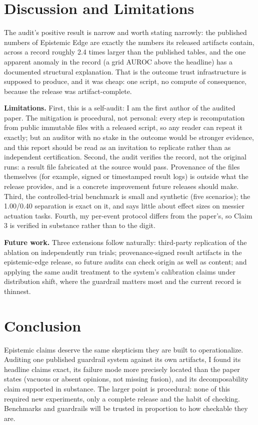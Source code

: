\documentclass[11pt]{article}
\begin{document}
\section{Discussion and Limitations}

The audit's positive result is narrow and worth stating narrowly: the published numbers of Epistemic Edge are exactly the numbers its released artifacts contain, across a record roughly 2.4 times larger than the published tables, and the one apparent anomaly in the record (a grid AUROC above the headline) has a documented structural explanation. That is the outcome trust infrastructure is supposed to produce, and it was cheap: one script, no compute of consequence, because the release was artifact-complete.

\textbf{Limitations.} First, this is a self-audit: I am the first author of the audited paper. The mitigation is procedural, not personal: every step is recomputation from public immutable files with a released script, so any reader can repeat it exactly; but an auditor with no stake in the outcome would be stronger evidence, and this report should be read as an invitation to replicate rather than as independent certification. Second, the audit verifies the record, not the original runs: a result file fabricated at the source would pass. Provenance of the files themselves (for example, signed or timestamped result logs) is outside what the release provides, and is a concrete improvement future releases should make. Third, the controlled-trial benchmark is small and synthetic (five scenarios); the 1.00/0.40 separation is exact on it, and says little about effect sizes on messier actuation tasks. Fourth, my per-event protocol differs from the paper's, so Claim 3 is verified in substance rather than to the digit.

\textbf{Future work.} Three extensions follow naturally: third-party replication of the ablation on independently run trials; provenance-signed result artifacts in the epistemic-edge release, so future audits can check origin as well as content; and applying the same audit treatment to the system's calibration claims under distribution shift, where the guardrail matters most and the current record is thinnest.

\section{Conclusion}

Epistemic claims deserve the same skepticism they are built to operationalize. Auditing one published guardrail system against its own artifacts, I found its headline claims exact, its failure mode more precisely located than the paper states (vacuous or absent opinions, not missing fusion), and its decomposability claim supported in substance. The larger point is procedural: none of this required new experiments, only a complete release and the habit of checking. Benchmarks and guardrails will be trusted in proportion to how checkable they are.
\end{document}
